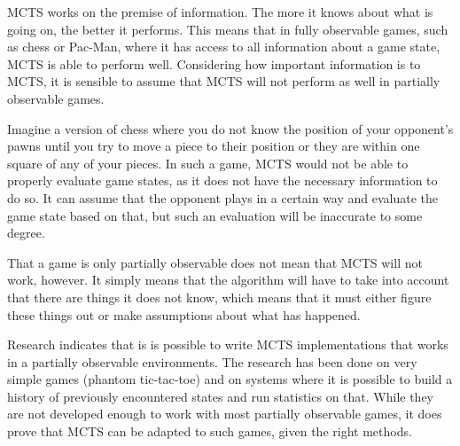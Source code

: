MCTS works on the premise of information. The more it knows about what is going on, the better it performs. This means that in fully observable games, such as chess or Pac-Man, where it has access to all information about a game state, MCTS is able to perform well. Considering how important information is to MCTS, it is sensible to assume that MCTS will not perform as well in partially observable games. 

Imagine a version of chess where you do not know the position of your opponent's pawns until you try to move a piece to their position or they are within one square of any of your pieces. In such a game, MCTS would not be able to properly evaluate game states, as it does not have the necessary information to do so. It can assume that the opponent plays in a certain way and evaluate the game state based on that, but such an evaluation will be inaccurate to some degree.

That a game is only partially observable does not mean that MCTS will not work, however. It simply means that the algorithm will have to take into account that there are things it does not know, which means that it must either figure these things out or make assumptions about what has happened.

Research indicates that is is possible to write MCTS implementations that works in a partially observable environments. The research has been done on very simple games (phantom tic-tac-toe)\cite{auger2011multiple} and on systems where it is possible to build a history of previously encountered states and run statistics on that\cite{silver2010monte}\cite{thrun1999monte}. While they are not developed enough to work with most partially observable games, it does prove that MCTS can be adapted to such games, given the right methods.




